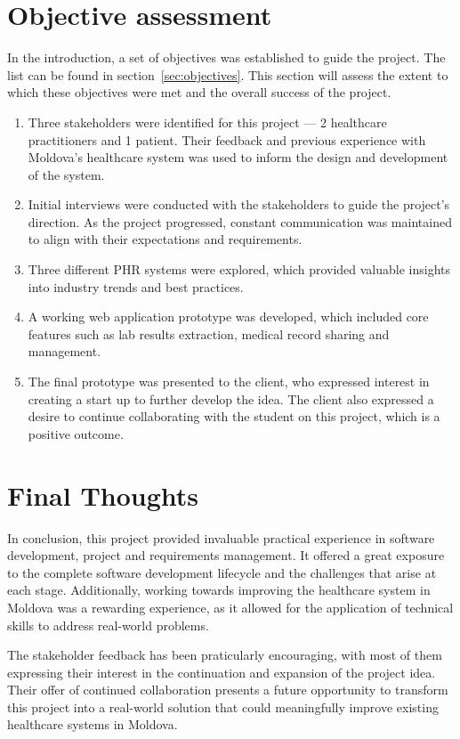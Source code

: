 \section{Objective assessment}

In the introduction, a set of objectives was established to guide the project. The list can be found in section~\ref{sec:objectives}. This section will assess the extent to which these objectives were met and the overall success of the project.

\begin{enumerate}
    \item Three stakeholders were identified for this project --- 2 healthcare practitioners and 1 patient. Their feedback and previous experience with Moldova's healthcare system was used to inform the design and development of the system.
    \item Initial interviews were conducted with the stakeholders to guide the project's direction. As the project progressed, constant communication was maintained to align with their expectations and requirements.
    \item Three different PHR systems were explored, which provided valuable insights into industry trends and best practices. 
    \item A working web application prototype was developed, which included core features such as lab results extraction, medical record sharing and management.
    \item The final prototype was presented to the client, who expressed interest in creating a start up to further develop the idea. The client also expressed a desire to continue collaborating with the student on this project, which is a positive outcome.
\end{enumerate}

\section{Final Thoughts}

In conclusion, this project provided invaluable practical experience in software development, project and requirements management. It offered a great exposure to the complete software development lifecycle and the challenges that arise at each stage. Additionally, working towards improving the healthcare system in Moldova was a rewarding experience, as it allowed for the application of technical skills to address real-world problems. 

The stakeholder feedback has been praticularly encouraging, with most of them expressing their interest in the continuation and expansion of the project idea. Their offer of continued collaboration presents a future opportunity to transform this project into a real-world solution that could meaningfully improve existing healthcare systems in Moldova.

